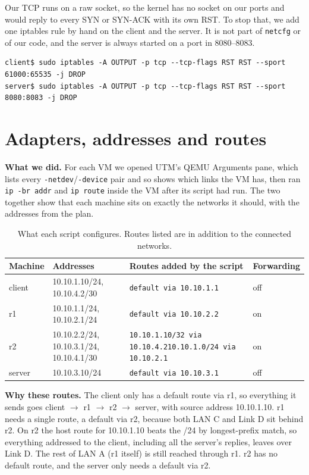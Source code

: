 \documentclass[10pt,a4paper]{article}
\newcommand{\cmd}[1]{\texttt{#1}}
\begin{document}
Our TCP runs on a raw socket, so the kernel has no socket on our ports and would reply to
every SYN or SYN-ACK with its own RST. To stop that, we add one iptables rule by hand on the
client and the server. It is not part of \cmd{netcfg} or of our code, and the server is always
started on a port in 8080--8083.
\begin{lstlisting}
client$ sudo iptables -A OUTPUT -p tcp --tcp-flags RST RST --sport 61000:65535 -j DROP
server$ sudo iptables -A OUTPUT -p tcp --tcp-flags RST RST --sport 8080:8083 -j DROP
\end{lstlisting}

\section{Adapters, addresses and routes}

\textbf{What we did.} For each VM we opened UTM's QEMU Arguments pane, which lists every
\cmd{-netdev}/\cmd{-device} pair and so shows which links the VM has, then ran \cmd{ip -br addr}
and \cmd{ip route} inside the VM after its script had run. The two together show that each machine sits on exactly the networks it should, with
the addresses from the plan.

\begin{table}[H]\centering\small
\begin{tabularx}{\linewidth}{@{}lp{4.3cm}Xl@{}}
\toprule
Machine & Addresses & Routes added by the script & Forwarding\\
\midrule
client & 10.10.1.10/24, 10.10.4.2/30 & \cmd{default via 10.10.1.1} & off\\
r1 & 10.10.1.1/24, 10.10.2.1/24 & \cmd{default via 10.10.2.2} & on\\
r2 & 10.10.2.2/24, 10.10.3.1/24, 10.10.4.1/30 &
  \cmd{10.10.1.10/32 via 10.10.4.2}\newline\cmd{10.10.1.0/24 via 10.10.2.1} & on\\
server & 10.10.3.10/24 & \cmd{default via 10.10.3.1} & off\\
\bottomrule
\end{tabularx}
\caption{What each script configures. Routes listed are in addition to the connected networks.}
\end{table}

\textbf{Why these routes.} The client only has a default route via r1, so everything it sends
goes client $\to$ r1 $\to$ r2 $\to$ server, with source address 10.10.1.10. r1 needs a single
route, a default via r2, because both LAN C and Link D sit behind r2. On r2 the host route for
10.10.1.10 beats the /24 by longest-prefix match, so everything addressed to the client,
including all the server's replies, leaves over Link D. The rest of LAN A (r1 itself) is still
reached through r1. r2 has no default route, and the server only needs a default via r2.
\end{document}
